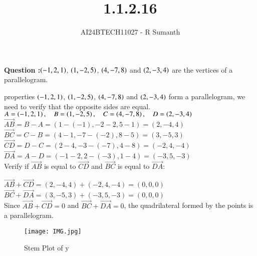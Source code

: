 \documentclass[journal]{IEEEtran}
\begin{document}

\vspace{3cm}

\title{1.1.2.16}
\author{AI24BTECH11027 - R Sumanth}
{\let\newpage\relax\maketitle}

\renewcommand{\thefigure}{\theenumi}
\renewcommand{\thetable}{\theenumi}
\setlength{\intextsep}{10pt} %



\textbf{Question :}$\left(-1,2,1\right)$, $\left(1,-2,5\right)$, $\left(4,-7,8\right)$ and $\left(2,-3,4\right)$ are the vertices of a parallelogram. 

\solution

properties $\left(-1, 2, 1\right)$, $\left(1, -2, 5\right)$, $\left(4, -7, 8\right)$ and $\left(2, -3, 4\right)$ form a parallelogram, we need to verify that the opposite sides are equal.\\

$A = \left(-1, 2, 1\right), \quad B = \left(1, -2, 5\right), \quad C = \left(4, -7, 8\right), \quad D = \left(2, -3, 4\right)$ \\


$\overrightarrow{AB} = B - A = (1 - (-1), -2 - 2, 5 - 1) = (2, -4, 4)$ \\

$\overrightarrow{BC} = C - B = (4 - 1, -7 - (-2), 8 - 5) = (3, -5, 3)$ \\

$\overrightarrow{CD} = D - C = (2 - 4, -3 - (-7), 4 - 8) = (-2, 4, -4)$ \\

$\overrightarrow{DA} = A - D = (-1 - 2, 2 - (-3), 1 - 4) = (-3, 5, -3)$ \\

Verify if $\overrightarrow{AB}$ is equal to $ \overrightarrow{CD} $ and $ \overrightarrow{BC} $ is equal to $ \overrightarrow{DA} $:

$\overrightarrow{AB} + \overrightarrow{CD} = (2, -4, 4) + (-2, 4, -4) = (0, 0, 0)$ \\

$\overrightarrow{BC} + \overrightarrow{DA} = (3, -5, 3) + (-3, 5, -3) = (0, 0, 0)$ \\

Since $\overrightarrow{AB} + \overrightarrow{CD} = 0 $ and $ \overrightarrow{BC} + \overrightarrow{DA} = 0 $, the quadrilateral formed by the points is a parallelogram.

\begin{figure}[h!]
   \centering
   \texttt{[image: IMG.jpg]}
   \caption{Stem Plot of y}
     \label{stemplot}
\end{figure}

\renewcommand{\thetable}{\theenumi}
\end{document}
